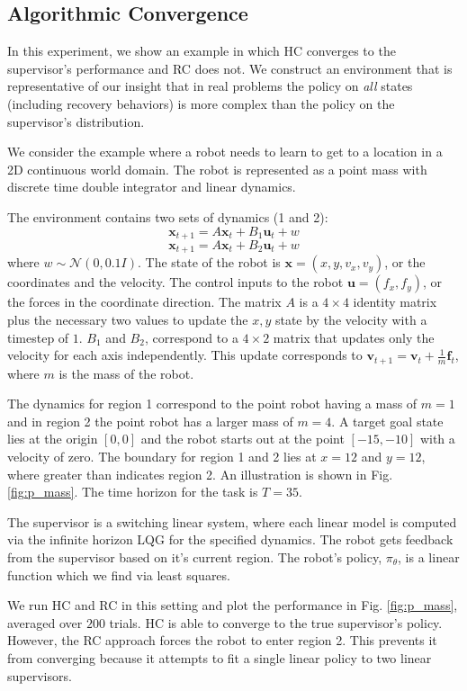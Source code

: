 \documentclass[10pt, conference]{ieeeconf}      %
\newcommand{\bu}{\mathbf{u}}
\newcommand{\bx}{\mathbf{x}}
\begin{document}
\subsection{Algorithmic Convergence}
In this experiment, we show an example in which HC converges to the supervisor's performance and RC does not. We construct an environment that is representative of our insight that in real problems the policy on \emph{all} states (including recovery behaviors) is more complex than the policy on the supervisor's distribution.

We consider the example where a robot needs to learn to get to a location in a 2D continuous world domain. The robot is represented as a point mass with discrete time double integrator and linear dynamics. 

The environment contains two sets of dynamics (1 and 2): 
$$\bx_{t+1} = A\bx_{t}+B_1\bu_t+w$$
$$\bx_{t+1} = A\bx_{t}+B_2\bu_t + w$$
where $w\sim \mathcal{N}(0,0.1 I)$. The state of the robot is $\bx = (x,y,v_x,v_y)$, or the coordinates and the velocity. The control inputs to the robot $\bu = (f_x,f_y)$, or the forces in the coordinate direction. The matrix $A$ is a $4\times4$ identity matrix plus the necessary two values to update the $x,y$ state by the velocity with a timestep of $1$. $B_1$ and $B_2$, correspond to a $4\times 2$ matrix that updates only the velocity for each axis independently. This update corresponds to $\mathbf{v}_{t+1} = \mathbf{v}_t+\frac{1}{m} \mathbf{f}_t$, where $m$ is the mass of the robot.


The dynamics for region 1 correspond to the point robot having a mass of $m=1$ and in region 2 the point robot has a larger mass of $m=4$. A target goal state lies at the origin $[0,0]$ and the robot starts out at the point $[-15,-10]$ with a velocity of zero. The boundary for region 1 and 2 lies at $x=12$ and $y=12$, where greater than indicates region 2. An illustration is shown in Fig. \ref{fig:p_mass}. The time horizon for the task is $T=35$. 

The supervisor is a switching linear system, where each linear model is computed via the infinite horizon LQG for the specified dynamics. The robot gets feedback from the supervisor based on it's current region. The robot's policy, $\pi_{\theta}$, is a linear function which we find via least squares. 

We run HC and RC in this setting and plot the performance in Fig. \ref{fig:p_mass}, averaged over $200$ trials.  HC is able to converge to the true supervisor's policy.
However, the RC approach forces the robot to enter region 2.
This prevents it from converging because it attempts to fit a single linear policy to two linear supervisors.
\end{document}
